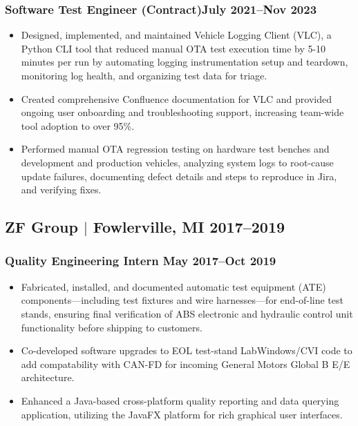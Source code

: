\documentclass[10pt]{article}
\begin{document}
\subsubsection{Software Test Engineer (Contract)\hfill July 2021--Nov 2023}
\begin{itemize}
  \item Designed, implemented, and maintained Vehicle Logging Client (VLC),
  a Python CLI tool that reduced manual OTA test execution time by 5-10 minutes 
  per run by automating logging instrumentation setup and teardown, monitoring 
  log health, and organizing test data for triage.
  \item Created comprehensive Confluence documentation for VLC and provided 
  ongoing user onboarding and troubleshooting support, increasing team-wide 
  tool adoption to over 95\%.
  \item Performed manual OTA regression testing on hardware test benches and 
  development and production vehicles, analyzing system logs to root-cause 
  update failures, documenting defect details and steps to reproduce in Jira, 
  and verifying fixes.
\end{itemize}

\subsection{ZF Group $|$ {\normalfont Fowlerville, MI} \hfill 2017--2019}
\vspace*{0.05in}
\subsubsection{Quality Engineering Intern \hfill May 2017--Oct 2019}
\begin{itemize}
  \item Fabricated, installed, and documented automatic test equipment (ATE) 
  components—including test fixtures and wire harnesses—for end-of-line test 
  stands, ensuring final verification of ABS electronic and hydraulic control 
  unit functionality before shipping to customers.
  \item Co-developed software upgrades to EOL test-stand LabWindows/CVI code 
  to add compatability with CAN-FD for incoming General Motors Global B E/E 
  architecture.
  \item Enhanced a Java-based cross-platform quality reporting and data 
  querying application, utilizing the JavaFX platform for rich graphical user 
  interfaces.
\end{itemize}
\end{document}
